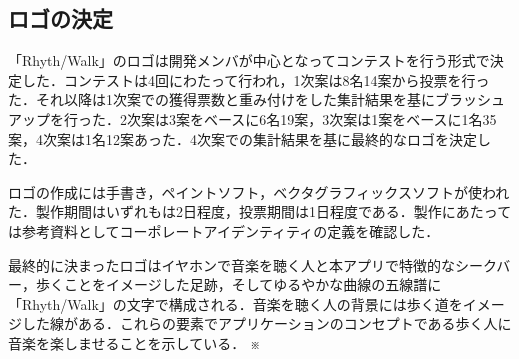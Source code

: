 \subsection{ロゴの決定}
\par 「Rhyth/Walk」のロゴは開発メンバが中心となってコンテストを行う形式で決定した．コンテストは4回にわたって行われ，1次案は8名14案から投票を行った．それ以降は1次案での獲得票数と重み付けをした集計結果を基にブラッシュアップを行った．2次案は3案をベースに6名19案，3次案は1案をベースに1名35案，4次案は1名12案あった．4次案での集計結果を基に最終的なロゴを決定した．
\par ロゴの作成には手書き，ペイントソフト，ベクタグラフィックスソフトが使われた．製作期間はいずれもは2日程度，投票期間は1日程度である．製作にあたっては参考資料としてコーポレートアイデンティティの定義を確認した．
\par 最終的に決まったロゴはイヤホンで音楽を聴く人と本アプリで特徴的なシークバー，歩くことをイメージした足跡，そしてゆるやかな曲線の五線譜に「Rhyth/Walk」の文字で構成される．音楽を聴く人の背景には歩く道をイメージした線がある．これらの要素でアプリケーションのコンセプトである歩く人に音楽を楽しませることを示している．
※
